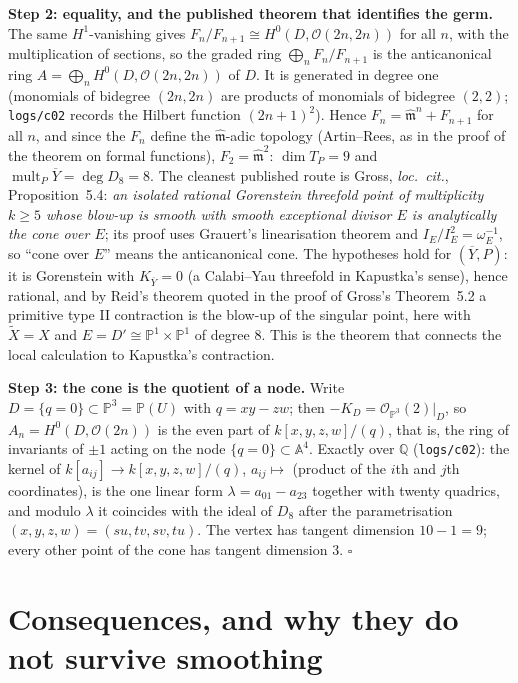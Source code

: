 \documentclass[10pt,a4paper]{article}
\theoremstyle{plain}
\theoremstyle{definition}
\theoremstyle{remark}
\begin{document}
\noindent\textbf{Step 2: equality, and the published theorem that
identifies the germ.} The same $H^1$-vanishing gives
$F_n/F_{n+1}\cong H^0(D,\mathcal{O}(2n,2n))$ for all $n$, with the
multiplication of sections, so the graded ring
$\bigoplus_n F_n/F_{n+1}$ is the anticanonical ring
$A=\bigoplus_n H^0(D,\mathcal{O}(2n,2n))$ of $D$. It is generated
in degree one (monomials of bidegree $(2n,2n)$ are products of
monomials of bidegree $(2,2)$; \texttt{logs/c02} records the
Hilbert function $(2n+1)^2$). Hence
$F_n=\widehat{\mathfrak{m}}^n+F_{n+1}$ for all $n$, and since the
$F_n$ define the $\widehat{\mathfrak{m}}$-adic topology (Artin--Rees,
as in the proof of the theorem on formal functions), $F_2=\widehat{\mathfrak{m}}^2$:
$\dim T_P=9$ and $\operatorname{mult}_P\overline{Y}=\deg D_8=8$.
The cleanest published route is Gross, \emph{loc.\ cit.},
Proposition~5.4: \emph{an isolated rational Gorenstein threefold
point of multiplicity $k\ge 5$ whose blow-up is smooth with smooth
exceptional divisor $E$ is analytically the cone over $E$}; its
proof uses Grauert's linearisation theorem and
$I_E/I_E^2=\omega_E^{-1}$, so ``cone over $E$'' means the
anticanonical cone. The hypotheses hold for $(\overline{Y},P)$: it
is Gorenstein with $K_{\overline{Y}}=0$ (a Calabi--Yau threefold in
Kapustka's sense), hence rational, and by Reid's theorem quoted in
the proof of Gross's Theorem~5.2 a primitive type II contraction is
the blow-up of the singular point, here with $\widetilde{X}=X$ and
$E=D'\cong\mathbb{P}^1\times\mathbb{P}^1$ of degree $8$. This is
the theorem that connects the local calculation to Kapustka's
contraction.

\noindent\textbf{Step 3: the cone is the quotient of a node.}
Write $D=\{q=0\}\subset\mathbb{P}^3=\mathbb{P}(U)$ with
$q=xy-zw$; then $-K_D=\mathcal{O}_{\mathbb{P}^3}(2)|_D$, so
$A_n=H^0(D,\mathcal{O}(2n))$ is the even part of $k[x,y,z,w]/(q)$,
that is, the ring of invariants of $\pm 1$ acting on the node
$\{q=0\}\subset\mathbb{A}^4$. Exactly over $\mathbb{Q}$
(\texttt{logs/c02}): the kernel of $k[a_{ij}]\to k[x,y,z,w]/(q)$,
$a_{ij}\mapsto$ (product of the $i$th and $j$th coordinates), is the
one linear form $\lambda=a_{01}-a_{23}$ together with twenty
quadrics, and modulo $\lambda$ it coincides with the ideal of $D_8$
after the parametrisation $(x,y,z,w)=(su,tv,sv,tu)$. The vertex has
tangent dimension $10-1=9$; every other point of the cone has
tangent dimension $3$. \hfill$\square$

\section{Consequences, and why they do not survive smoothing}
\end{document}
